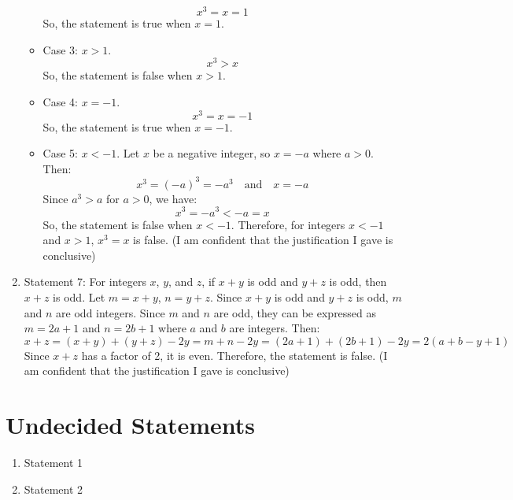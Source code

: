 \documentclass{article}
\begin{document}
\begin{enumerate}
\begin{itemize}
                    \[
                        x^3 = x = 1
                    \]
                    So, the statement is true when $x = 1$.
              \item Case 3: $x > 1$.
                    \[
                        x^3 > x
                    \]
                    So, the statement is false when $x > 1$.
              \item Case 4: $x = -1$.
                    \[
                        x^3 = x = -1
                    \]
                    So, the statement is true when $x = -1$.
              \item Case 5: $x < -1$.
                    Let \(x\) be a negative integer, so \(x = -a\) where \(a > 0\).
                    Then:
                    \[
                        x^3 = {(-a)}^3 = -a^3 \quad \text{and} \quad x = -a
                    \]
                    Since \(a^3 > a\) for \(a > 0\), we have:
                    \[
                        x^3 = -a^3 < -a = x
                    \]
                    So, the statement is false when $x < -1$.\newline
                    Therefore, for integers \(x < -1\) and \(x > 1\), \(x^3 = x\) is false.\newline
                    (I am confident that the justification I gave is conclusive)
          \end{itemize}
    \item Statement 7: For integers $x$, $y$, and $z$, if $x+y$ is odd and $y+z$ is odd, then $x+z$ is odd.\newline
          Let \(m = x + y\), \(n = y + z\). Since \(x + y\) is odd and \(y + z\) is odd, \(m\) and \(n\) are odd integers.\newline
          Since \(m\) and \(n\) are odd, they can be expressed as \(m = 2a + 1\) and \(n = 2b + 1\) where \(a\) and \(b\) are integers.\newline
          Then:
          \[
              x + z = (x + y) + (y + z) - 2y = m + n - 2y = (2a + 1) + (2b + 1) - 2y = 2(a + b - y + 1)
          \]
          Since \(x + z\) has a factor of 2, it is even.\newline
          Therefore, the statement is false.\newline
          (I am confident that the justification I gave is conclusive)
\end{enumerate}

\section{Undecided Statements}

\begin{enumerate}
    \item Statement 1
    \item Statement 2
\end{enumerate}
\end{document}
